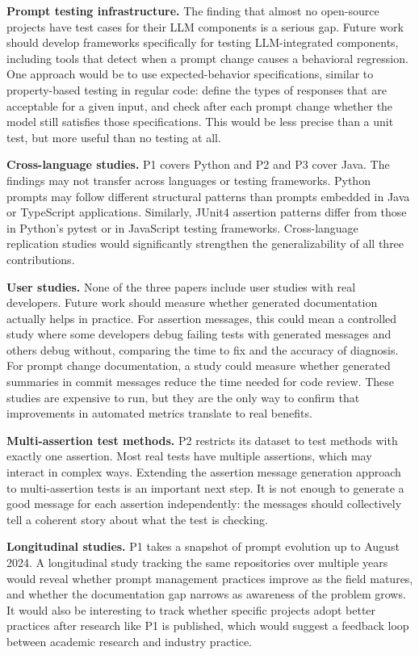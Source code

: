 \documentclass[
    pdftex,
    final,
    11pt,
    a4paper,
    parskip=false,
    oneside,
    footheight=0mm,
    footinclude=false,
    toc=bibliography
]{scrbook}
\begin{document}
\textbf{Prompt testing infrastructure.} The finding that almost no open-source projects have test cases for their LLM components is a serious gap. Future work should develop frameworks specifically for testing LLM-integrated components, including tools that detect when a prompt change causes a behavioral regression. One approach would be to use expected-behavior specifications, similar to property-based testing in regular code: define the types of responses that are acceptable for a given input, and check after each prompt change whether the model still satisfies those specifications. This would be less precise than a unit test, but more useful than no testing at all.

\textbf{Cross-language studies.} P1 covers Python and P2 and P3 cover Java. The findings may not transfer across languages or testing frameworks. Python prompts may follow different structural patterns than prompts embedded in Java or TypeScript applications. Similarly, JUnit4 assertion patterns differ from those in Python's pytest or in JavaScript testing frameworks. Cross-language replication studies would significantly strengthen the generalizability of all three contributions.

\textbf{User studies.} None of the three papers include user studies with real developers. Future work should measure whether generated documentation actually helps in practice. For assertion messages, this could mean a controlled study where some developers debug failing tests with generated messages and others debug without, comparing the time to fix and the accuracy of diagnosis. For prompt change documentation, a study could measure whether generated summaries in commit messages reduce the time needed for code review. These studies are expensive to run, but they are the only way to confirm that improvements in automated metrics translate to real benefits.

\textbf{Multi-assertion test methods.} P2 restricts its dataset to test methods with exactly one assertion. Most real tests have multiple assertions, which may interact in complex ways. Extending the assertion message generation approach to multi-assertion tests is an important next step. It is not enough to generate a good message for each assertion independently: the messages should collectively tell a coherent story about what the test is checking.

\textbf{Longitudinal studies.} P1 takes a snapshot of prompt evolution up to August 2024. A longitudinal study tracking the same repositories over multiple years would reveal whether prompt management practices improve as the field matures, and whether the documentation gap narrows as awareness of the problem grows. It would also be interesting to track whether specific projects adopt better practices after research like P1 is published, which would suggest a feedback loop between academic research and industry practice.
\end{document}

